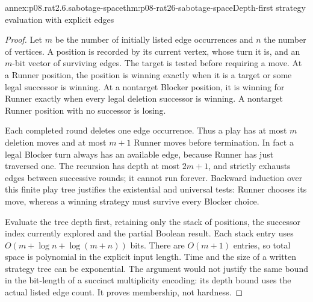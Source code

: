 \begin{annexitem}{annex:p08.rat2.6.sabotage-space}{thm:p08-rat26-sabotage-space}{Depth-first strategy evaluation with explicit edges}
\begin{proof}
Let \(m\) be the number of initially listed edge occurrences and
\(n\) the number of vertices. A position is recorded by its current
vertex, whose turn it is, and an \(m\)-bit vector of surviving edges.
The target is tested before requiring a move. At a Runner position,
the position is winning exactly when it is a target or some legal
successor is winning. At a nontarget Blocker position, it is winning
for Runner exactly when every legal deletion successor is winning.
A nontarget Runner position with no successor is losing.

Each completed round deletes one edge occurrence. Thus a play has at
most \(m\) deletion moves and at most \(m+1\) Runner moves before
termination. In fact a legal Blocker turn always has an available edge,
because Runner has just traversed one. The recursion has depth at most
\(2m+1\), and strictly exhausts edges between successive rounds;
it cannot run forever. Backward induction over this finite play tree
justifies the existential and universal tests: Runner chooses its move,
whereas a winning strategy must survive every Blocker choice.

Evaluate the tree depth first, retaining only the stack of positions,
the successor index currently explored and the partial Boolean result.
Each stack entry uses \(O(m+\log n+\log(m+n))\) bits. There are
\(O(m+1)\) entries, so total space is polynomial in the explicit
input length. Time and the size of a written strategy tree can be
exponential. The argument would not justify the same bound in the
bit-length of a succinct multiplicity encoding: its depth bound uses
the actual listed edge count. It proves membership, not hardness.
\end{proof}
\end{annexitem}

